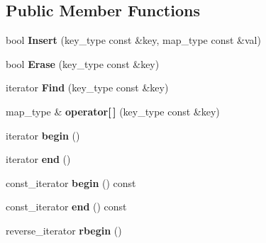 \subsection*{Public Member Functions}
\begin{DoxyCompactItemize}
\item 
\hypertarget{classlsf_1_1container_1_1Map_ab64e3f23f786d07318c43f56a68020f7}{
bool {\bfseries Insert} (key\_\-type const \&key, map\_\-type const \&val)}
\label{classlsf_1_1container_1_1Map_ab64e3f23f786d07318c43f56a68020f7}

\item 
\hypertarget{classlsf_1_1container_1_1Map_a9e62e4bb77c8506a89b4bbb4b49b8a38}{
bool {\bfseries Erase} (key\_\-type const \&key)}
\label{classlsf_1_1container_1_1Map_a9e62e4bb77c8506a89b4bbb4b49b8a38}

\item 
\hypertarget{classlsf_1_1container_1_1Map_aa99cfab681658b26556c400771cd472b}{
iterator {\bfseries Find} (key\_\-type const \&key)}
\label{classlsf_1_1container_1_1Map_aa99cfab681658b26556c400771cd472b}

\item 
\hypertarget{classlsf_1_1container_1_1Map_a4945785866cf81805103f7596e82b1f0}{
map\_\-type \& {\bfseries operator\mbox{[}$\,$\mbox{]}} (key\_\-type const \&key)}
\label{classlsf_1_1container_1_1Map_a4945785866cf81805103f7596e82b1f0}

\item 
\hypertarget{classlsf_1_1container_1_1Map_acbde5f39ecab751a3dd9da8e5707b54c}{
iterator {\bfseries begin} ()}
\label{classlsf_1_1container_1_1Map_acbde5f39ecab751a3dd9da8e5707b54c}

\item 
\hypertarget{classlsf_1_1container_1_1Map_a52ffacb7e942bfb02bf3a22fa567e746}{
iterator {\bfseries end} ()}
\label{classlsf_1_1container_1_1Map_a52ffacb7e942bfb02bf3a22fa567e746}

\item 
\hypertarget{classlsf_1_1container_1_1Map_a55740fde8f7e4ef62127980a98cdf69c}{
const\_\-iterator {\bfseries begin} () const }
\label{classlsf_1_1container_1_1Map_a55740fde8f7e4ef62127980a98cdf69c}

\item 
\hypertarget{classlsf_1_1container_1_1Map_aa59b5b5c109c0c6af4ebd5b5e8d5a15b}{
const\_\-iterator {\bfseries end} () const }
\label{classlsf_1_1container_1_1Map_aa59b5b5c109c0c6af4ebd5b5e8d5a15b}

\item 
\hypertarget{classlsf_1_1container_1_1Map_a83b350d1543fd125fdb239a945826582}{
reverse\_\-iterator {\bfseries rbegin} ()}
\label{classlsf_1_1container_1_1Map_a83b350d1543fd125fdb239a945826582}


\end{DoxyCompactItemize}
